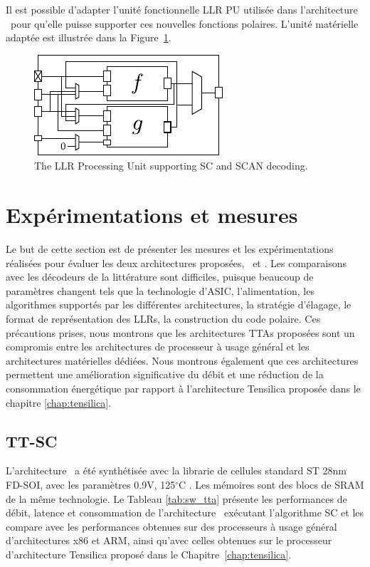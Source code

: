 Il est possible d'adapter l'unité fonctionnelle LLR PU utilisée dans l'architecture \TTSC~pour qu'elle puisse supporter ces nouvelles fonctions polaires. L'unité matérielle adaptée est illustrée dans la Figure~\ref{fig:scan_unit}.

\begin{figure}[htp]
\centering
\includegraphics[scale=1.5]{main/ch4_fig/scan_unit}
\caption{The LLR Processing Unit supporting SC and SCAN decoding.}
\label{fig:scan_unit}
\end{figure}


\section{Expérimentations et mesures}
Le but de cette section est de présenter les mesures et les expérimentations réalisées pour évaluer les deux architectures proposées, \TTSC~et \TTSCAN. Les comparaisons avec les décodeurs de la littérature sont difficiles, puisque beaucoup de paramètres changent tels que la technologie d'ASIC, l'alimentation, les algorithmes supportés par les différentes architectures, la stratégie d'élagage, le format de représentation des LLRs, la construction du code polaire. Ces précautions prises, nous montrons que les architectures TTAs proposées sont un compromis entre les architectures de processeur à usage général et les architectures matérielles dédiées. Nous montrons également que ces architectures permettent une amélioration significative du débit et une réduction de la consommation énergétique par rapport à l'architecture Tensilica proposée dans le chapitre \ref{chap:tensilica}.

\subsection{TT-SC}


L'architecture \TTSC~a été synthétisée avec la librarie de cellules standard ST 28nm FD-SOI, avec les paramètres 0.9V, 125$^{\circ}$C . Les mémoires sont des blocs de SRAM de la même technologie. Le Tableau \ref{tab:sw_tta} présente les performances de débit, latence et consommation de l'architecture \TTSC~exécutant l'algorithme SC et les compare avec les performances obtenues sur des processeurs à usage général d'architectures x86 et ARM, ainsi qu'avec celles obtenues sur le processeur d'architecture Tensilica proposé dans le Chapitre~\ref{chap:tensilica}.


